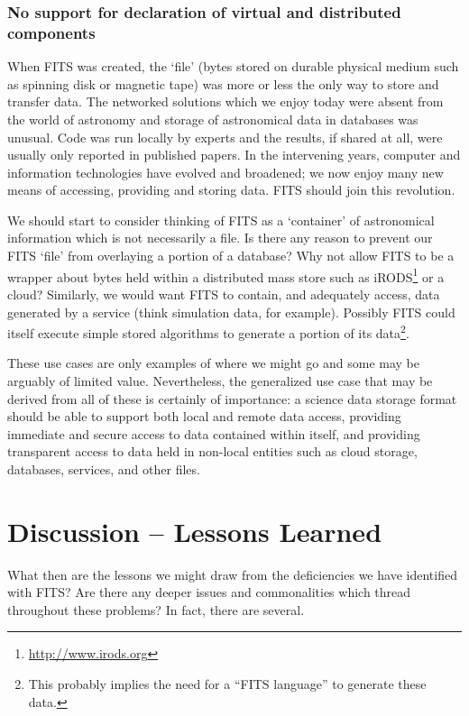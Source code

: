 \documentclass[final,authoryear,5p,times,twocolumn]{elsarticle}
\begin{document}
{{\subsubsection{No support for declaration of virtual and distributed components}


When FITS was created, the `file' (bytes stored on durable physical
medium such as spinning disk or magnetic tape) was more or less the
only way to store and transfer data. The networked solutions which we
enjoy today were absent from the world of astronomy and storage of
astronomical data in databases was unusual. Code was run locally by
experts and the results, if shared at all, were usually only reported
in published papers. In the intervening years, computer and
information technologies have evolved and broadened; we now enjoy many
new means of accessing, providing and storing data. FITS should join
this revolution.


We should start to consider thinking of FITS as a `container' of
astronomical information which is not necessarily a file. Is there
any reason to prevent our FITS `file' from overlaying a portion of a
database? Why not allow FITS to be a wrapper about bytes held within a
distributed mass store such as
iRODS\footnote{\url{http://www.irods.org}} \citep[see e.g.,][]{2007AGUFMIN13B1214R}
or a cloud?  Similarly, we would
want FITS to contain, and adequately access, data generated by a
service (think simulation data, for example). Possibly FITS could
itself execute simple stored algorithms to generate a portion of its
data\footnote{This probably implies the need for a ``FITS language'' 
to generate these data.}.


These use cases are only examples of where we might go and some may be
arguably of limited value. Nevertheless, the generalized use case that
may be derived from all of these is certainly of importance:
a science data storage format should be able to support both local 
and remote data access, providing immediate and secure access to data 
contained within itself, and providing transparent access to data held 
in non-local entities such as cloud storage, databases, services, and 
other files.


\section{Discussion -- Lessons Learned}

What then are the lessons we might draw from the deficiencies
we have identified with FITS? Are there any deeper issues and 
commonalities which thread throughout these problems? In fact,
there are several.


}}
\end{document}
